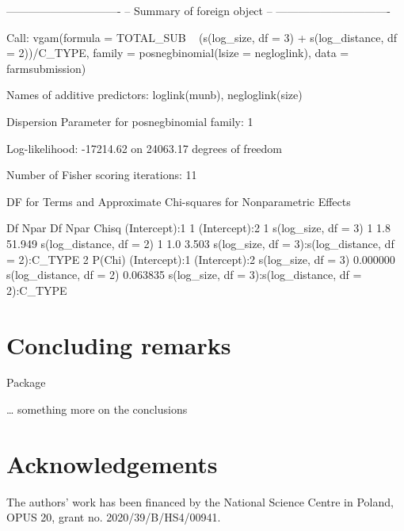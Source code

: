 \documentclass[
]{jss}
\newcommand{\1}{\mathcal{I}} \newcommand{\bZero}{\boldsymbol{0}}
\begin{document}
\begin{CodeChunk}
\begin{CodeOutput}
-------------------------------
-- Summary of foreign object --
-------------------------------

Call:
vgam(formula = TOTAL_SUB ~ (s(log_size, df = 3) + s(log_distance, 
    df = 2))/C_TYPE, family = posnegbinomial(lsize = negloglink), 
    data = farmsubmission)

Names of additive predictors: loglink(munb), negloglink(size)

Dispersion Parameter for posnegbinomial family:   1

Log-likelihood: -17214.62 on 24063.17 degrees of freedom

Number of Fisher scoring iterations:  11 

DF for Terms and Approximate Chi-squares for Nonparametric Effects

                                                   Df Npar Df Npar Chisq
(Intercept):1                                       1                   
(Intercept):2                                       1                   
s(log_size, df = 3)                                 1     1.8     51.949
s(log_distance, df = 2)                             1     1.0      3.503
s(log_size, df = 3):s(log_distance, df = 2):C_TYPE  2                   
                                                     P(Chi)
(Intercept):1                                              
(Intercept):2                                              
s(log_size, df = 3)                                0.000000
s(log_distance, df = 2)                            0.063835
s(log_size, df = 3):s(log_distance, df = 2):C_TYPE         
\end{CodeOutput}
\end{CodeChunk}

\normalsize

\section{Concluding remarks}\label{concluding-remarks}

Package 

\ldots{} something more on the conclusions

\section{Acknowledgements}\label{Acknowledgements}

The authors' work has been financed by the National Science Centre in
Poland, OPUS 20, grant no. 2020/39/B/HS4/00941.
\end{document}

